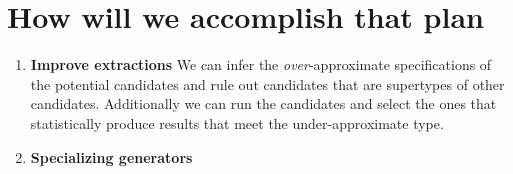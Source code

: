 \documentclass[review, sigplan]{acmart}
\begin{document}
\section*{How will we accomplish that plan}


\begin{enumerate}
\item \textbf{Improve extractions}
    We can infer the \emph{over}-approximate
    specifications of the potential candidates and rule
    out candidates that are supertypes of other candidates.
    Additionally we can run the candidates and select the
    ones that statistically produce results that
    meet the under-approximate type.

\item \textbf{Specializing generators}
\end{enumerate}



\end{document}
